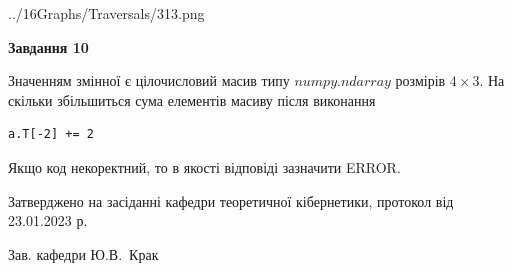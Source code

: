 \documentclass[12pt, ukrainian]{article}
\begin{document}
{\begin {large}
\begin{center}
	{../16Graphs/Traversals/313.png}
\end{center}\par
\newpage

{\begin {center}\textbf{Завдання 10}\end {center}}\par
Значенням змінної  є цілочисловий масив типу $numpy.ndarray$ розмірів $4{\times}3$. На скільки збільшиться сума елементів масиву  після виконання
\begin{verbatim}
a.T[-2] += 2
\end{verbatim}


Якщо код некоректний, то в якості відповіді зазначити ERROR.\par
\newpage


\end {large}
}
{\smallskip \begin {small} Затверджено на засіданні кафедри теоретичної кібернетики, протокол  від   23.01.2023 р.\par\smallskip\smallskip
{\parbox {6.5 cm}{Зав. кафедри \dotfill Ю.В.~Крак}} \end{small}}
\end{document}
